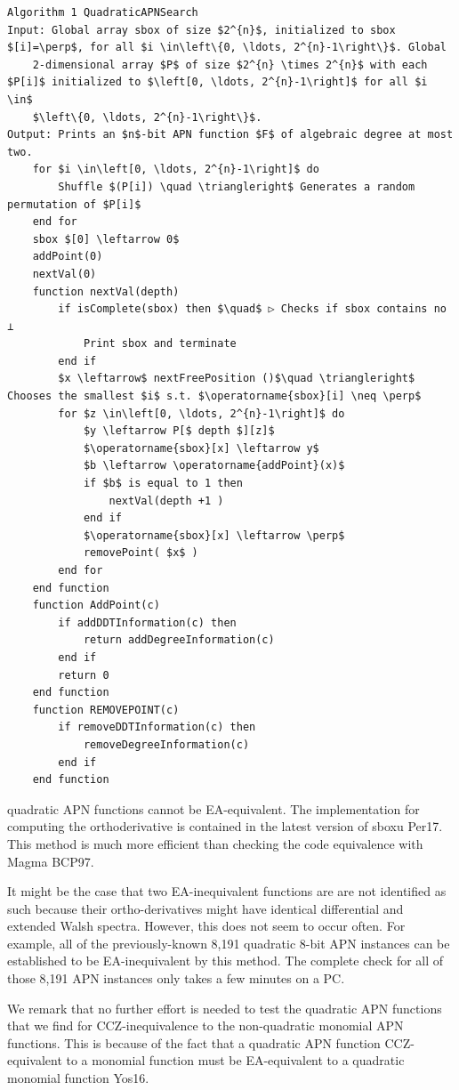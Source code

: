 \documentclass[10pt]{article}
\begin{document}
\begin{verbatim}
Algorithm 1 QuadraticAPNSearch
Input: Global array sbox of size $2^{n}$, initialized to sbox $[i]=\perp$, for all $i \in\left\{0, \ldots, 2^{n}-1\right\}$. Global
    2-dimensional array $P$ of size $2^{n} \times 2^{n}$ with each $P[i]$ initialized to $\left[0, \ldots, 2^{n}-1\right]$ for all $i \in$
    $\left\{0, \ldots, 2^{n}-1\right\}$.
Output: Prints an $n$-bit APN function $F$ of algebraic degree at most two.
    for $i \in\left[0, \ldots, 2^{n}-1\right]$ do
        Shuffle $(P[i]) \quad \triangleright$ Generates a random permutation of $P[i]$
    end for
    sbox $[0] \leftarrow 0$
    addPoint(0)
    nextVal(0)
    function nextVal(depth)
        if isComplete(sbox) then $\quad$ ▷ Checks if sbox contains no ⟂
            Print sbox and terminate
        end if
        $x \leftarrow$ nextFreePosition ()$\quad \triangleright$ Chooses the smallest $i$ s.t. $\operatorname{sbox}[i] \neq \perp$
        for $z \in\left[0, \ldots, 2^{n}-1\right]$ do
            $y \leftarrow P[$ depth $][z]$
            $\operatorname{sbox}[x] \leftarrow y$
            $b \leftarrow \operatorname{addPoint}(x)$
            if $b$ is equal to 1 then
                nextVal(depth +1 )
            end if
            $\operatorname{sbox}[x] \leftarrow \perp$
            removePoint( $x$ )
        end for
    end function
    function AddPoint(c)
        if addDDTInformation(c) then
            return addDegreeInformation(c)
        end if
        return 0
    end function
    function REMOVEPOINT(c)
        if removeDDTInformation(c) then
            removeDegreeInformation(c)
        end if
    end function
\end{verbatim}

quadratic APN functions cannot be EA-equivalent. The implementation for computing the orthoderivative is contained in the latest version of sboxu Per17. This method is much more efficient than checking the code equivalence with Magma BCP97.

It might be the case that two EA-inequivalent functions are are not identified as such because their ortho-derivatives might have identical differential and extended Walsh spectra. However, this does not seem to occur often. For example, all of the previously-known 8,191 quadratic 8-bit APN instances can be established to be EA-inequivalent by this method. The complete check for all of those 8,191 APN instances only takes a few minutes on a PC.

We remark that no further effort is needed to test the quadratic APN functions that we find for CCZ-inequivalence to the non-quadratic monomial APN functions. This is because of the fact that a quadratic APN function CCZ-equivalent to a monomial function must be EA-equivalent to a quadratic monomial function Yos16.
\end{document}
